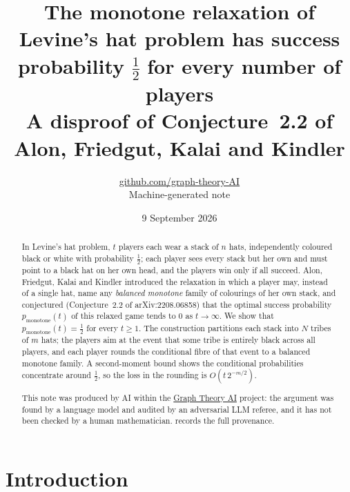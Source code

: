 \documentclass[11pt,a4paper]{article}
\title{The monotone relaxation of Levine's hat problem has success probability $\tfrac12$ for every number of players\\[1ex] \large A disproof of Conjecture~2.2 of Alon, Friedgut, Kalai and Kindler}
\author{\href{https://github.com/graph-theory-AI}{github.com/graph-theory-AI}\\[2pt] \normalsize Machine-generated note}
\date{9 September 2026}
\theoremstyle{plain}
\theoremstyle{definition}
\theoremstyle{remark}
\newcommand{\pmon}{p_{\mathrm{monotone}}}
\begin{document}
\maketitle


\begin{abstract}
In Levine's hat problem, $t$ players each wear a stack of $n$ hats, independently coloured black or white with probability $\tfrac12$; each player sees every stack but her own and must point to a black hat on her own head, and the players win only if all succeed. Alon, Friedgut, Kalai and Kindler introduced the relaxation in which a player may, instead of a single hat, name any \emph{balanced monotone} family of colourings of her own stack, and conjectured (Conjecture~2.2 of arXiv:2208.06858) that the optimal success probability $\pmon(t)$ of this relaxed game tends to $0$ as $t\to\infty$. We show that $\pmon(t)=\tfrac12$ for every $t\ge1$. The construction partitions each stack into $N$ tribes of $m$ hats; the players aim at the event that some tribe is entirely black across all players, and each player rounds the conditional fibre of that event to a balanced monotone family. A second-moment bound shows the conditional probabilities concentrate around $\tfrac12$, so the loss in the rounding is $O(t\,2^{-m/2})$.

\medskip\noindent\small
This note was produced by AI within the \href{https://github.com/graph-theory-AI/Graph-Theory-LLM-Proofs}{Graph Theory AI} project:
the argument was found by a language model and audited by an adversarial LLM
referee, and it has not been checked by a human mathematician.
 records the full provenance.

\end{abstract}

\section{Introduction}
\end{document}
